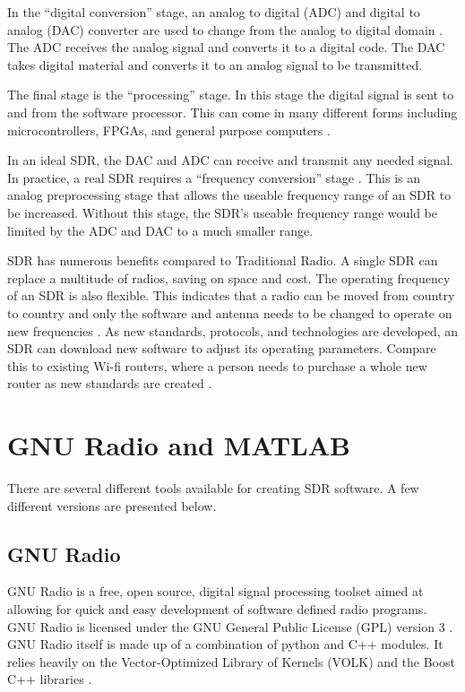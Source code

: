 In the ``digital conversion'' stage, an analog to digital (ADC) and digital to analog (DAC) converter are used to change from the analog to digital domain \cite{761033}\cite{0020}. The ADC receives the analog signal and converts it to a digital code. The DAC takes digital material and converts it to an analog signal to be transmitted. 

The final stage is the ``processing'' stage. In this stage the digital signal is sent to and from the software processor. This can come in many different forms including microcontrollers, FPGAs, and general purpose computers \cite{393001}\cite{0020}.  

In an ideal SDR, the DAC and ADC can receive and transmit any needed signal. In practice, a real SDR requires a ``frequency conversion'' stage \cite{393001} \cite{0020}. This is an analog preprocessing stage that allows the useable frequency range of an SDR to be increased. Without this stage, the SDR's useable frequency range would be limited by the ADC and DAC to a much smaller range. 

SDR has numerous benefits compared to Traditional Radio. A single SDR can replace a multitude of radios, saving on space and cost. The operating frequency of an SDR is also flexible. This indicates that a radio can be moved from country to country and only the software and antenna needs to be changed to operate on new frequencies \cite{393001} \cite{0019}. As new standards, protocols, and technologies are developed, an SDR can download new software to adjust its operating parameters. Compare this to existing Wi-fi routers, where a person needs to purchase a whole new router as new standards are created \cite{761033} \cite{0019}. 


\section{GNU Radio and MATLAB}

There are several different tools available for creating SDR software. A few different versions are presented below. 

\subsection{GNU Radio}

GNU Radio is a free, open source, digital signal processing toolset aimed at allowing for quick and easy development of software defined radio programs. GNU Radio is licensed under the GNU General Public License (GPL) version 3 \cite{0019}. GNU Radio itself is made up of a combination of python and C++ modules. It relies heavily on the Vector-Optimized Library of Kernels (VOLK) \cite{0021} and the Boost C++ libraries \cite{0022}. 

